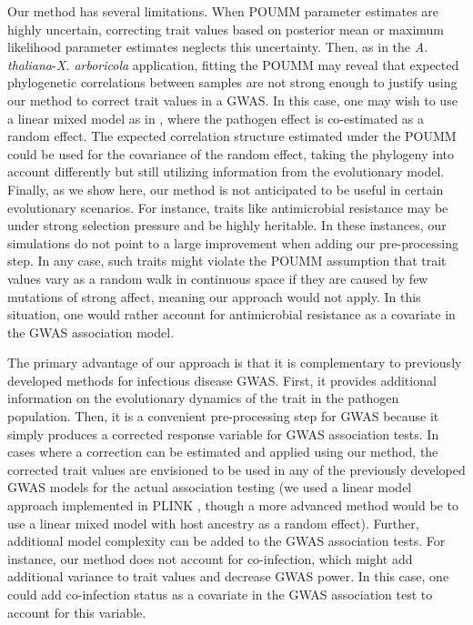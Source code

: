 \documentclass[11pt]{article}
\begin{document}
\begin{linenumbers}
Our method has several limitations. When POUMM parameter estimates are highly uncertain, correcting trait values based on posterior mean or maximum likelihood parameter estimates neglects this uncertainty. Then, as in the \emph{A. thaliana}-\emph{X. arboricola} application, fitting the POUMM may reveal that expected phylogenetic correlations between samples are not strong enough to justify using our method to correct trait values in a GWAS. In this case, one may wish to use a linear mixed model as in \cite{Wang2018Two-wayGenomes}, where the pathogen effect is co-estimated as a random effect. The expected correlation structure estimated under the POUMM could be used for the covariance of the random effect, taking the phylogeny into account differently but still utilizing information from the evolutionary model. Finally, as we show here, our method is not anticipated to be useful in certain evolutionary scenarios. For instance, traits like antimicrobial resistance may be under strong selection pressure and be highly heritable. In these instances, our simulations do not point to a large improvement when adding our pre-processing step. In any case, such traits might violate the POUMM assumption that trait values vary as a random walk in continuous space if they are caused by few mutations of strong affect, meaning our approach would not apply. In this situation, one would rather account for antimicrobial resistance as a covariate in the GWAS association model.

The primary advantage of our approach is that it is complementary to previously developed methods for infectious disease GWAS. First, it provides additional information on the evolutionary dynamics of the trait in the pathogen population. Then, it is a convenient pre-processing step for GWAS because it simply produces a corrected response variable for GWAS association tests.  In cases where a correction can be estimated and applied using our method, the corrected trait values are envisioned to be used in any of the previously developed GWAS models for the actual association testing (we used a linear model approach implemented in PLINK \citep{Chang2015}, though a more advanced method would be to use a linear mixed model with host ancestry as a random effect). Further, additional model complexity can be added to the GWAS association tests. For instance, our method does not account for co-infection, which might add additional variance to trait values and decrease GWAS power. In this case, one could add co-infection status as a covariate in the GWAS association test to account for this variable. 


\end{linenumbers}
\end{document}
